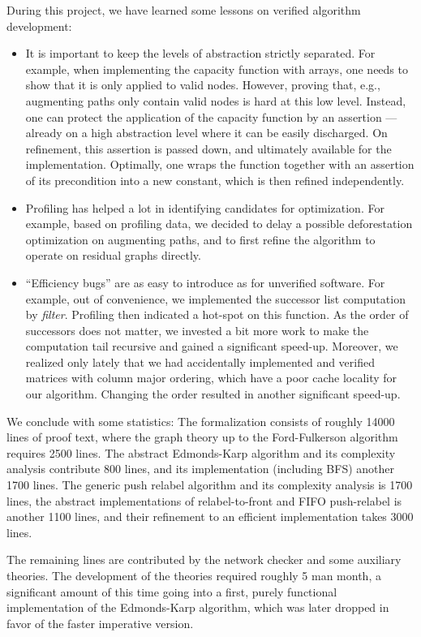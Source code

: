 \documentclass[smallcondensed]{svjour3}     %
\begin{document}
  During this project, we have learned some lessons on verified algorithm development: 
  \begin{itemize}
  \item It is important to keep the levels of abstraction strictly separated.
    For example, when implementing the capacity function with arrays, one needs to show that it is only applied to valid nodes.
    However, proving that, e.g., augmenting paths only contain valid nodes is hard at this low level. 
    Instead, one can protect the application of the capacity function by an assertion --- already on a high abstraction level where it can be easily discharged. 
    On refinement, this assertion is passed down, and ultimately available for the implementation.
    Optimally, one wraps the function together with an assertion of its precondition into a new constant, which is then refined independently.
  \item Profiling has helped a lot in identifying candidates for optimization. For example, based on profiling data, we decided to delay a 
    possible deforestation optimization on augmenting paths, and to first refine the algorithm to operate on residual graphs directly.
  \item ``Efficiency bugs'' are as easy to introduce as for unverified software. For example, out of convenience, we implemented the successor list computation by
    \emph{filter}. Profiling then indicated a hot-spot on this function. As the order of successors does not matter, we invested a bit more work to make the computation tail 
    recursive and gained a significant speed-up. Moreover, we realized only lately that we had accidentally implemented and verified
    matrices with column major ordering, which have a poor cache locality for our algorithm. Changing the order resulted in another significant speed-up.
  \end{itemize}
  
  We conclude with some statistics:
  The formalization consists of roughly 14000 lines of proof text, where the graph theory up to the Ford-Fulkerson algorithm requires 2500 lines.
  The abstract Edmonds-Karp algorithm and its complexity analysis contribute 800 lines, and its implementation (including BFS) another 1700 lines.
  The generic push relabel algorithm and its complexity analysis is 1700 lines, the abstract implementations of relabel-to-front and FIFO push-relabel is another 1100 lines,
  and their refinement to an efficient implementation takes 3000 lines.
  
  The remaining lines are contributed by the network checker and some auxiliary theories. The development of the theories required roughly 5 man month, a significant amount of this time going into a first, purely functional implementation of the Edmonds-Karp algorithm, which was later dropped in favor of the faster imperative version.
  
\end{document}
